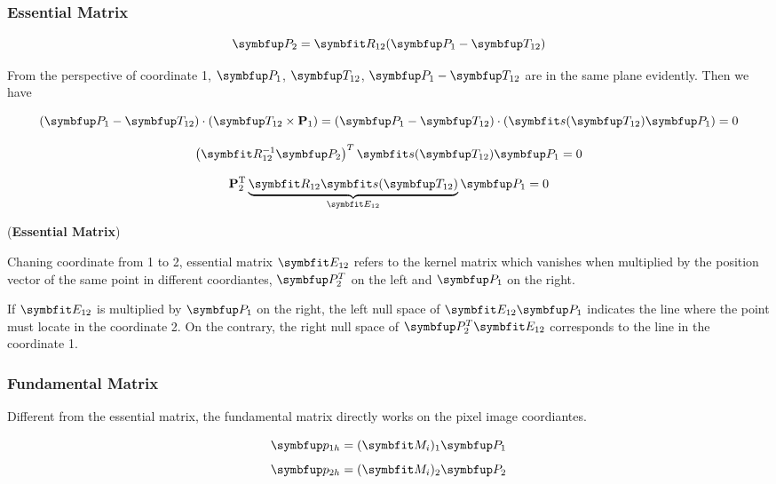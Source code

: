 \subsubsection{Essential Matrix}
$$\Vect{P}_2=\Matr{R}_{12}(\Vect{P}_1-\Vect{T}_{12})$$

From the perspective of coordinate 1, $\Vect{P}_1$, $\Vect{T}_{12}$, $\Vect{P}_1-\Vect{T}_{12}$ are in the same plane evidently.
Then we have 

\begin{equation}
\left(\Vect{P}_{1}-\Vect{T}_{12}\right) \cdot\left(\Vect{T}_{12} \times \mathbf{P}_{1}\right)=\left(\Vect{P}_{1}-\Vect{T}_{12}\right) \cdot\left(\Matr{s}(\Vect{T}_{12})  \Vect{P}_{1}\right)=0
\end{equation}

\begin{equation}
\left(\Matr{R}_{12}^{-1} \Vect{P}_{2}\right)^{T} \Matr{s}(\Vect{T}_{12}) \Vect{P}_{1}=0
\end{equation}

\begin{equation}\label{formula:essential_matrix}
\mathbf{P}_{2}^{\mathrm{T}} \underbrace{\Matr{R}_{12} \Matr{s}(\Vect{T}_{12})}_{\Matr{E}_{12}} \Vect{P}_{1}=0
\end{equation}
\begin{definition}
(\textbf{Essential Matrix})

Chaning coordinate from 1 to 2, essential matrix $\Matr{E}_{12}$ refers to the kernel matrix which vanishes when multiplied by the position vector of the same point in different coordiantes, $\Vect{P}_2^T$ on the left and $\Vect{P}_1$ on the right.

If $\Matr{E}_{12}$ is multiplied by $\Vect{P}_1$ on the right, the left null space of $\Matr{E}_{12}\Vect{P}_1$ indicates the line where the point must locate in the coordinate 2. On the contrary, the right null space of $\Vect{P}_2^T \Matr{E}_{12}$ corresponds to the line in the coordinate 1.
\end{definition}
\subsubsection{Fundamental Matrix}

Different from the essential matrix, the fundamental matrix directly works on the pixel image coordiantes.

$$\Vect{p}_{1h} = (\Matr{M}_i)_1 \Vect{P}_1$$
$$\Vect{p}_{2h} = (\Matr{M}_i)_2 \Vect{P}_2$$

